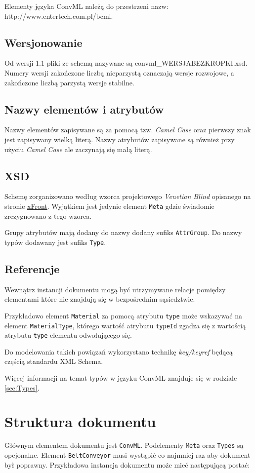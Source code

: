 \documentclass[12pt,a4paper]{article}
\begin{document}
Elementy języka ConvML należą do przestrzeni nazw:
http://www.entertech.com.pl/bcml.

\subsection{Wersjonowanie}
Od wersji 1.1 pliki ze schemą nazywane są convml\_WERSJABEZKROPKI.xsd. Numery
wersji zakończone liczbą nieparzystą oznaczają wersje rozwojowe, a zakończone
liczbą parzystą wersje stabilne.

\subsection{Nazwy elementów i atrybutów}
Nazwy elementów zapisywane są za pomocą tzw. \emph{Camel Case} oraz pierwszy znak jest
zapisywany wielką literą. Nazwy atrybutów zapisywane są również przy użyciu
\emph{Camel Case} ale zaczynają się małą literą.

\subsection{XSD}
Schemę zorganizowano według wzorca projektowego \emph{Venetian Blind} opisanego na
stronie \href{http://www.xfront.com/GlobalVersusLocal.html}{xFront}. Wyjątkiem jest
jedynie element {\tt Meta} gdzie świadomie zrezygnowano z tego wzorca.

Grupy atrybutów mają dodany do nazwy dodany sufiks {\tt AttrGroup}. Do nazwy typów
dodawany jest sufiks {\tt Type}.

\subsection{Referencje}
Wewnątrz instancji dokumentu mogą być utrzymywane relacje pomiędzy elementami
które nie znajdują się w bezpośrednim sąsiedztwie.

Przykładowo element {\tt Material} za pomocą atrybutu {\tt type} może wskazywać na
element {\tt MaterialType}, którego wartość atrybutu {\tt typeId} zgadza się z
wartością atrybutu {\tt type} elementu odwołującego się.

Do modelowania takich powiązań wykorzystano technikę \emph{key/keyref} będącą
częścią standardu XML Schema.

Więcej informacji na temat typów w języku ConvML znajduje się w rodziale
\ref{sec:Types}.


\section{Struktura dokumentu}
Głównym elementem dokumentu jest {\tt ConvML}.  Podelementy {\tt Meta} oraz
{\tt Types} są opcjonalne. Element {\tt BeltConveyor} musi wystąpić co
najmniej raz aby dokument był poprawny.  Przykładowa instancja dokumentu może
mieć następującą postać:
\end{document}

